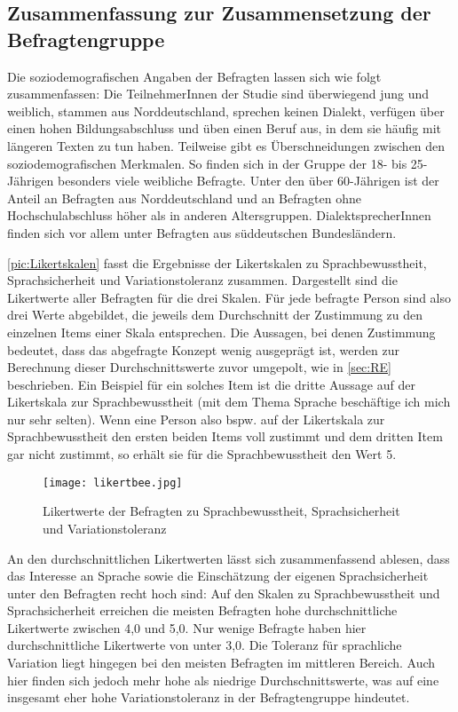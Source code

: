 \subsection{Zusammenfassung zur Zusammensetzung der Befragtengruppe}
\label{sec:ZsfsgBefragte}
Die soziodemografischen Angaben der Befragten lassen sich wie folgt zusammenfassen:
Die TeilnehmerInnen der Studie sind überwiegend jung und weiblich, stammen aus Norddeutschland, sprechen keinen Dialekt, verfügen über einen hohen Bildungsabschluss und üben einen Beruf aus, in dem sie häufig mit längeren Texten zu tun haben.
Teilweise gibt es Überschneidungen zwischen den soziodemografischen Merkmalen. 
So finden sich in der Gruppe der 18- bis 25-Jährigen besonders viele weibliche Befragte. 
Unter den über 60-Jährigen ist der Anteil an Befragten aus Norddeutschland und an Befragten ohne Hochschulabschluss höher als in anderen Altersgruppen. 
DialektsprecherInnen finden sich vor allem unter Befragten aus süddeutschen Bundesländern. 

\autoref{pic:Likertskalen} fasst die Ergebnisse der Likertskalen zu Sprachbewusstheit, Sprachsicherheit und Variationstoleranz zusammen. 
Dargestellt sind die Likertwerte aller Befragten für die drei Skalen. 
Für jede befragte Person sind also drei Werte abgebildet, die jeweils  dem Durchschnitt der Zustimmung zu den einzelnen Items einer Skala entsprechen.
Die Aussagen, bei denen Zustimmung bedeutet, dass das abgefragte Konzept wenig ausgeprägt ist, werden zur Berechnung dieser Durchschnittswerte zuvor umgepolt, wie  in \autoref{sec:RE} beschrieben. 
Ein Beispiel für ein solches Item ist die dritte Aussage auf der Likertskala zur Sprachbewusstheit (\glqq mit dem Thema Sprache beschäftige ich mich nur sehr selten\grqq).
Wenn eine Person also bspw. auf der Likertskala zur Sprachbewusstheit den ersten beiden Items voll zustimmt und dem dritten Item gar nicht zustimmt, so erhält sie für die Sprachbewusstheit den Wert 5. 
\begin{figure}
\centering
\texttt{[image: likertbee.jpg]}
\caption{Likertwerte der Befragten zu Sprachbewusstheit, Sprachsicherheit und Variationstoleranz}
\label{pic:Likertskalen}
\end{figure}
 
An den durchschnittlichen Likertwerten lässt sich zusammenfassend ablesen, dass das Interesse an Sprache sowie die Einschätzung der eigenen Sprachsicherheit unter den Befragten recht hoch sind:
Auf den Skalen zu Sprachbewusstheit und Sprachsicherheit erreichen die meisten Befragten hohe durchschnittliche Likertwerte zwischen 4,0 und 5,0. 
Nur wenige Befragte haben hier durchschnittliche Likertwerte von unter 3,0. 
Die Toleranz für sprachliche Variation liegt hingegen bei den meisten Befragten im mittleren Bereich. 
Auch hier finden sich jedoch mehr hohe als niedrige Durchschnittswerte, was auf eine insgesamt eher hohe Variationstoleranz in der Befragtengruppe hindeutet.  
